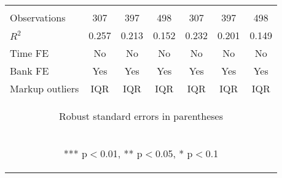 \documentclass[]{article}
\begin{document}
\begin{center}
\begin{tabular}{lcccccc}
\vspace{4pt} & \begin{footnotesize}\end{footnotesize} & \begin{footnotesize}\end{footnotesize} & \begin{footnotesize}\end{footnotesize} & \begin{footnotesize}\end{footnotesize} & \begin{footnotesize}\end{footnotesize} & \begin{footnotesize}\end{footnotesize} \\
Observations & 307 & 397 & 498 & 307 & 397 & 498 \\
$R^2$ & 0.257 & 0.213 & 0.152 & 0.232 & 0.201 & 0.149 \\
Time FE & No & No & No & No & No & No \\
Bank FE & Yes & Yes & Yes & Yes & Yes & Yes \\
 Markup outliers & IQR & IQR & IQR & IQR & IQR & IQR \\ \hline
\multicolumn{7}{c}{\begin{footnotesize} Robust standard errors in parentheses\end{footnotesize}} \\
\multicolumn{7}{c}{\begin{footnotesize} *** p$<$0.01, ** p$<$0.05, * p$<$0.1\end{footnotesize}} \\
\end{tabular}
\end{center}
\end{document}
